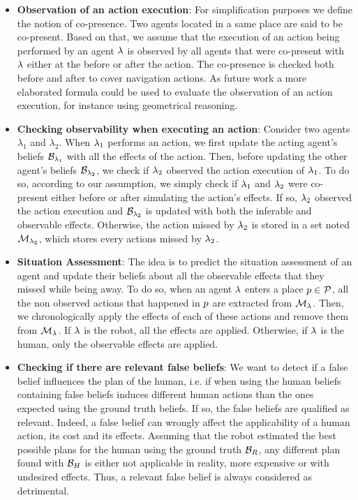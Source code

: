 \documentclass[letterpaper]{article} %
\begin{document}
\begin{itemize}

    \item \textbf{Observation of an action execution}: 
    For simplification purposes we define the notion of co-presence. Two agents located in a same place are said to be co-present.
    Based on that, we assume that the execution of an action being performed by an agent $\lambda$ is observed by all agents that were co-present with $\lambda$ either at the before or after the action.
    The co-presence is checked both before and after to cover navigation actions.
    As future work a more elaborated formula could be used to evaluate the observation of an action execution, for instance using geometrical reasoning.
    
    \item \textbf{Checking observability when executing an action}: 
    Consider two agents $\lambda_1$ and $\lambda_2$. When $\lambda_1$ performs an action, we first update the acting agent's beliefs $\mathcal{B}_{\lambda_1}$ with all the effects of the action. Then, before updating the other agent's beliefs $\mathcal{B}_{\lambda_2}$, we check if $\lambda_2$ observed the action execution of $\lambda_1$. 
    To do so, according to our assumption, we simply check if $\lambda_1$ and $\lambda_2$ were co-present either before or after simulating the action's effects. If so, $\lambda_2$ observed the action execution and $\mathcal{B}_{\lambda_2}$ is updated with both the inferable and observable effects. 
    Otherwise, the action missed by $\lambda_2$ is stored in a set noted $\mathcal{M}_{\lambda_2}$, which stores every actions missed by $\lambda_2$.
    
    \item \textbf{Situation Assessment}: 
    The idea is to predict the situation assessment of an agent and update their beliefs about all the observable effects that they missed while being away. 
    To do so, when an agent $\lambda$ enters a place $p\in\mathcal{P}$, all the non observed actions that happened in $p$ are extracted from $\mathcal{M}_\lambda$. Then, we chronologically apply the effects of each of these actions and remove them from $\mathcal{M}_\lambda$. If $\lambda$ is the robot, all the effects are applied. Otherwise, if $\lambda$ is the human, only the observable effects are applied. 
    
    \item \textbf{Checking if there are relevant false beliefs}: 
    We want to detect if a false belief influences the plan of the human, i.e. if when using the human beliefs containing false beliefs induces different human actions than the ones expected using the ground truth beliefs. If so, the false beliefs are qualified as relevant. Indeed, a false belief can wrongly affect the applicability of a human action, its cost and its effects. Assuming that the robot estimated the best possible plans for the human using the ground truth $\mathcal{B}_R$, any different plan found with $\mathcal{B}_H$ is either not applicable in reality, more expensive or with undesired effects. Thus, a relevant false belief is always considered as detrimental.


\end{itemize}
\end{document}
